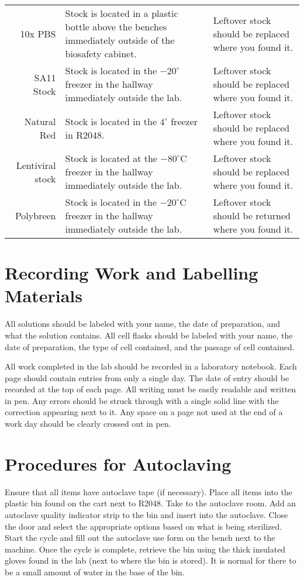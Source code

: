 \begin{tabular*}{\textwidth}{r | p{2in} p{2in}}
10x PBS & Stock is located in a plastic bottle above the benches immediately outside of the biosafety cabinet. & Leftover stock should be replaced where you found it. \\
SA11 Stock & Stock is located in the $-20^{\circ}$ freezer in the hallway immediately outside the lab. & Leftover stock should be replaced where you found it.\\
Natural Red & Stock is located in the $4^{\circ}$ freezer in R2048. & Leftover stock should be replaced where you found it.\\
Lentiviral stock & Stock is located at the $-80^{\circ}$C freezer in the hallway immediately outside the lab. & Leftover stock should be replaced where you found it. \\
Polybreen & Stock is located in the $-20^{\circ}$C freezer in the hallway immediately outside the lab. & Leftover stock should be returned where you found it.\\
\hline
\end{tabular*}

\section{Recording Work and Labelling Materials}

All solutions should be labeled with your name, the date of preparation, and what the solution contains. All cell flasks should be labeled with your name, the date of preparation, the type of cell contained, and the passage of cell contained.

All work completed in the lab should be recorded in a laboratory notebook. Each page should contain entries from only a single day. The date of entry should be recorded at the top of each page. All writing must be easily readable and written in pen. Any errors should be struck through with a single solid line with the correction appearing next to it. Any space on a page not used at the end of a work day should be clearly crossed out in pen.

\section{Procedures for Autoclaving}

Ensure that all items have autoclave tape (if necessary). Place all items into the plastic bin found on the cart next to R2048. Take to the autoclave room. Add an autoclave quality indicator strip to the bin and insert into the autoclave. Close the door and select the appropriate options based on what is being sterilized. Start the cycle and fill out the autoclave use form on the bench next to the machine. Once the cycle is complete, retrieve the bin using the thick insulated gloves found in the lab (next to where the bin is stored). It is normal for there to be a small amount of water in the base of the bin.

